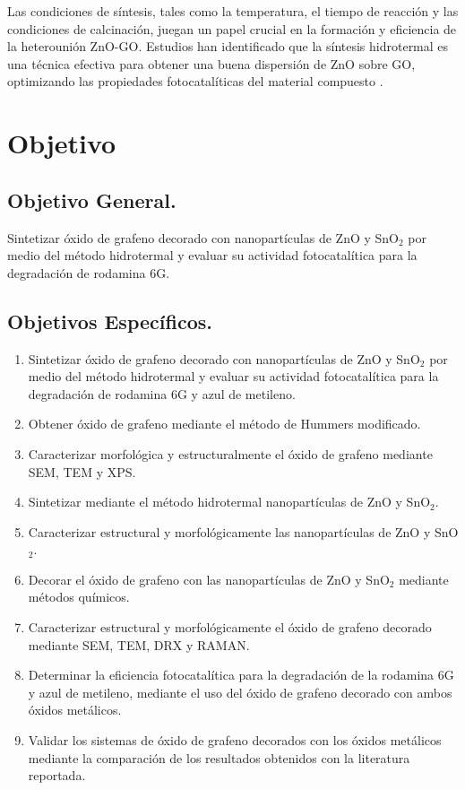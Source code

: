 \documentclass[12pt]{article}
\begin{document}
Las condiciones de síntesis, tales como la temperatura, el tiempo de reacción y las condiciones de calcinación, juegan un papel crucial en la formación y eficiencia de la heterounión ZnO-GO. Estudios han identificado que la síntesis hidrotermal es una técnica efectiva para obtener una buena dispersión de ZnO sobre GO, optimizando las propiedades fotocatalíticas del material compuesto \cite{IEEEreferencias:Ref32}.
\vspace{1em} %

\newpage
\section{Objetivo}
\subsection{Objetivo General.}

Sintetizar óxido de grafeno decorado con nanopartículas de ZnO y SnO$\displaystyle _{2}$ por medio del método hidrotermal y evaluar su actividad fotocatalítica para la degradación de rodamina 6G.

\subsection{Objetivos Específicos.}
\begin{enumerate}

\item Sintetizar óxido de grafeno decorado con nanopartículas de ZnO y SnO$\displaystyle _{2}$ por medio del método hidrotermal y evaluar su actividad fotocatalítica para la degradación de rodamina 6G y azul de metileno.
\item Obtener óxido de grafeno mediante el método de Hummers modificado.
\item Caracterizar morfológica y estructuralmente el óxido de grafeno mediante SEM, TEM y XPS.
\item Sintetizar mediante el método hidrotermal nanopartículas de ZnO y SnO$\displaystyle _{2}$.
\item Caracterizar estructural y morfológicamente las nanopartículas de ZnO y SnO$\displaystyle _{2}$.
\item Decorar el óxido de grafeno con las nanopartículas de ZnO y SnO$\displaystyle _{2}$ mediante métodos químicos.
\item Caracterizar estructural y morfológicamente el óxido de grafeno decorado mediante SEM, TEM, DRX y RAMAN.
\item Determinar la eficiencia fotocatalítica para la degradación de la rodamina 6G y azul de metileno, mediante el uso del óxido de grafeno decorado con ambos óxidos metálicos.
\item Validar los sistemas de óxido de grafeno decorados con los óxidos metálicos mediante la comparación de los resultados obtenidos con la literatura reportada.
\end{enumerate}
\end{document}
